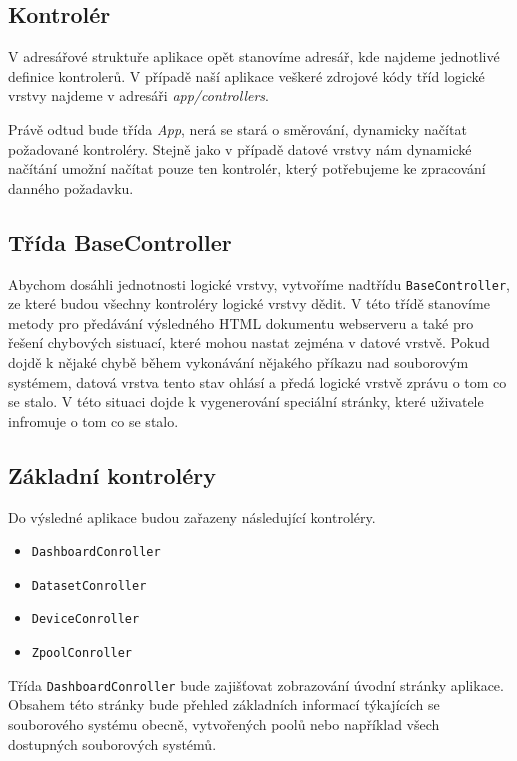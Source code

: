     \subsection{Kontrolér}
    V adresářové struktuře aplikace opět stanovíme adresář, kde najdeme jednotlivé definice kontrolerů. V případě naší aplikace veškeré zdrojové kódy tříd logické vrstvy najdeme v adresáři \emph{app/controllers}.

    Právě odtud bude třída \emph{App}, nerá se stará o směrování, dynamicky načítat požadované kontroléry. Stejně jako v případě datové vrstvy nám dynamické načítání umožní načítat pouze ten kontrolér, který potřebujeme ke zpracování danného požadavku.
    
    \subsection{Třída BaseController}
    Abychom dosáhli jednotnosti logické vrstvy, vytvoříme nadtřídu \verb|BaseController|, ze které budou všechny kontroléry logické vrstvy dědit. V této třídě stanovíme metody pro předávání výsledného HTML dokumentu webserveru a také pro řešení chybových sistuací, které mohou nastat zejména v datové vrstvě. Pokud dojdě k nějaké chybě během vykonávání nějakého příkazu nad souborovým systémem, datová vrstva tento stav ohlásí a předá logické vrstvě zprávu o tom co se stalo. V této situaci dojde k vygenerování speciální stránky, které uživatele infromuje o tom co se stalo.
    \subsection{Základní kontroléry}
    Do výsledné aplikace budou zařazeny následující kontroléry.
    \begin{itemize}
      \item \verb|DashboardConroller|      
      \item \verb|DatasetConroller|
      \item \verb|DeviceConroller|
      \item \verb|ZpoolConroller|
    \end{itemize}
    
    Třída \verb|DashboardConroller| bude zajišťovat zobrazování úvodní stránky aplikace. Obsahem této stránky bude přehled základních informací týkajících se souborového systému obecně, vytvořených poolů nebo například všech dostupných souborových systémů.
    
